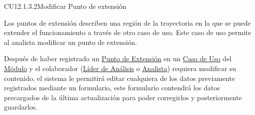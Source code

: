 	\begin{UseCase}{CU12.1.3.2}{Modificar Punto de extensión}{
		Los puntos de extensión describen una región de la trayectoria en la que se puede extender el funcionamiento a través de otro caso de uso. Este caso de uso permite al analista modificar un punto de extensión.
		
		Después de haber registrado un \hyperlink{entidadExtension}{Punto de Extensión} en un \hyperlink{casoUso}{Caso de Uso} del \hyperlink{moduloEntidad}{Módulo} y el colaborador (\hyperlink{jefe}{Líder de Análisis} o \hyperlink{analista}{Analista}) requiera modificar su contenido, el sistema le permitirá editar cualquiera de los datos previamente registrados mediante un formulario, este formulario contendrá los datos precargados de la última actualización para poder corregirlos y posteriormente guardarlos.\\
		
}
\end{UseCase}
